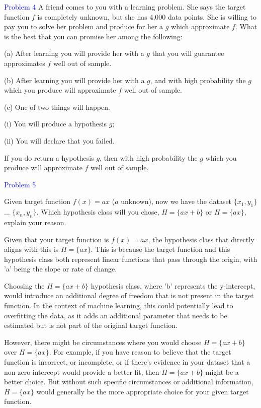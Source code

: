 \documentclass{article}
\begin{document}
\newpage

\textcolor{blue}{Problem 4}
A friend comes to you with a learning problem. She says the target function  $f$ is completely unknown, but she has 4,000 data points. She is willing to pay you to solve her problem and produce for her a $g$ which approximate $f$. What is the best that you can promise her among the following:

(a) After learning you will provide her with a $g$ that you will guarantee approximates $f$ well out of sample.

(b) After learning you will provide her with a $g$, and with high probability the $g$ which you produce will approximate $f$ well out of sample.

(c) One of two things will happen.

\quad(i) You will produce a hypothesis $g$;

\quad(ii) You will declare that you failed. 

\quad If you do return a hypothesis $g$, then with high probability the $g$ which you produce will approximate $f$ well out of sample.



\newpage



\textcolor{blue}{Problem 5}

Given target function $ f(x) = ax $ ($a$ unknown), now we have the dataset $\{x_1,y_1\}$ ... $\{x_n,y_n\}$. Which hypothesis class will you chose, $ H = \{ax + b\} $ or $H = \{ax\} $, explain your reason.


Given that your target function is $f(x) = ax$, the hypothesis class that directly aligns with this is $H = \{ax\}$. This is because the target function and this hypothesis class both represent linear functions that pass through the origin, with 'a' being the slope or rate of change.

Choosing the $H = \{ax + b\}$ hypothesis class, where 'b' represents the y-intercept, would introduce an additional degree of freedom that is not present in the target function. In the context of machine learning, this could potentially lead to overfitting the data, as it adds an additional parameter that needs to be estimated but is not part of the original target function. 

However, there might be circumstances where you would choose $H = \{ax + b\}$ over $H = \{ax\}$. For example, if you have reason to believe that the target function is incorrect, or incomplete, or if there's evidence in your dataset that a non-zero intercept would provide a better fit, then $H = \{ax + b\}$ might be a better choice. But without such specific circumstances or additional information, $H = \{ax\}$ would generally be the more appropriate choice for your given target function.
\end{document}
